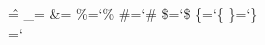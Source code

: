 \chardef\^=\caretasciicode
\chardef\_=\underscoreasciicode %
\chardef\&=\ampersandasciicode
\chardef\%=`\%
\chardef\#=`\#
\chardef\$=`\$
\chardef\{=`\{
\chardef\}=`\}
\chardef\\=`\\

\def\_{\dontleavehmode \kern.06em \vbox{\hrule width.3em}}


\def\unprotect {\pushcatcodetable\setcatcodetable\prtcatcodes}
\def\protect   {\popcatcodetable}

\endinput
